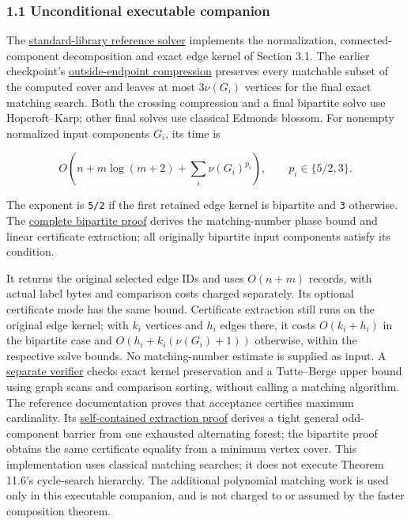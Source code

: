 \hypertarget{af-46593eb93e-unconditional-executable-companion}{%
\subsubsection{1.1 Unconditional executable companion}\label{af-46593eb93e-unconditional-executable-companion}}

The \href{https://github.com/icekylinx/algorithm-frontier/blob/main/problems/general-matching/reference/README.md}{standard-library reference solver} implements the normalization, connected-component decomposition and exact edge kernel of Section 3.1. The earlier checkpoint's \href{https://github.com/icekylinx/algorithm-frontier/blob/main/problems/general-matching/reference/cover-compression-proof.md}{outside-endpoint compression} preserves every matchable subset of the computed cover and leaves at most \(3\nu(G_i)\) vertices for the final exact matching search. Both the crossing compression and a final bipartite solve use Hopcroft--Karp; other final solves use classical Edmonds blossom. For nonempty normalized input components \(G_i\), its time is

\[
O\!\left(n+m\log(m+2)+\sum_i\nu(G_i)^{p_i}\right),
\qquad p_i\in\{5/2,3\}.
\]

The exponent is \texttt{5/2} if the first retained edge kernel is bipartite and \texttt{3} otherwise. The \href{https://github.com/icekylinx/algorithm-frontier/blob/main/problems/general-matching/reference/bipartite-proof.md}{complete bipartite proof} derives the matching-number phase bound and linear certificate extraction; all originally bipartite input components satisfy its condition.

It returns the original selected edge IDs and uses \(O(n+m)\) records, with actual label bytes and comparison costs charged separately. Its optional certificate mode has the same bound. Certificate extraction still runs on the original edge kernel; with \(k_i\) vertices and \(h_i\) edges there, it costs \(O(k_i+h_i)\) in the bipartite case and \(O(h_i+k_i(\nu(G_i)+1))\) otherwise, within the respective solve bounds. No matching-number estimate is supplied as input. A \href{https://github.com/icekylinx/algorithm-frontier/blob/main/problems/general-matching/reference/verify_certificate.py}{separate verifier} checks exact kernel preservation and a Tutte--Berge upper bound using graph scans and comparison sorting, without calling a matching algorithm. The reference documentation proves that acceptance certifies maximum cardinality. Its \href{https://github.com/icekylinx/algorithm-frontier/blob/main/problems/general-matching/reference/certificate-proof.md}{self-contained extraction proof} derives a tight general odd-component barrier from one exhausted alternating forest; the bipartite proof obtains the same certificate equality from a minimum vertex cover. This implementation uses classical matching searches; it does not execute Theorem 11.6's cycle-search hierarchy. The additional polynomial matching work is used only in this executable companion, and is not charged to or assumed by the faster composition theorem.

